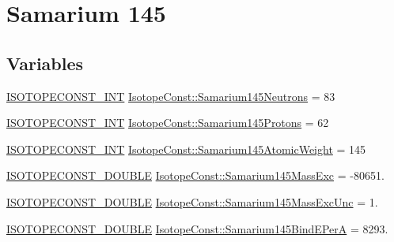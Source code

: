 \hypertarget{group___isotope_const-_samarium-_sm145}{}\section{Samarium 145}
\label{group___isotope_const-_samarium-_sm145}
\subsection*{Variables}
\begin{DoxyCompactItemize}
\item 
\mbox{\hyperlink{group___isotope_const-_macros_ga5f18360b3e99483a35c32d789e62621c}{I\+S\+O\+T\+O\+P\+E\+C\+O\+N\+S\+T\+\_\+\+I\+NT}} \mbox{\hyperlink{group___isotope_const-_samarium-_sm145_ga9203c0d6780ee502af8d9bd99e9adb3d}{Isotope\+Const\+::\+Samarium145\+Neutrons}} = 83
\item 
\mbox{\hyperlink{group___isotope_const-_macros_ga5f18360b3e99483a35c32d789e62621c}{I\+S\+O\+T\+O\+P\+E\+C\+O\+N\+S\+T\+\_\+\+I\+NT}} \mbox{\hyperlink{group___isotope_const-_samarium-_sm145_gaf61e64e167442d8c949a19465b5dec0b}{Isotope\+Const\+::\+Samarium145\+Protons}} = 62
\item 
\mbox{\hyperlink{group___isotope_const-_macros_ga5f18360b3e99483a35c32d789e62621c}{I\+S\+O\+T\+O\+P\+E\+C\+O\+N\+S\+T\+\_\+\+I\+NT}} \mbox{\hyperlink{group___isotope_const-_samarium-_sm145_ga1a430476f1e8e52a4878b48fd610f991}{Isotope\+Const\+::\+Samarium145\+Atomic\+Weight}} = 145
\item 
\mbox{\hyperlink{group___isotope_const-_macros_ga8f45a7272ce02c0b4c65c44636ed719a}{I\+S\+O\+T\+O\+P\+E\+C\+O\+N\+S\+T\+\_\+\+D\+O\+U\+B\+LE}} \mbox{\hyperlink{group___isotope_const-_samarium-_sm145_ga92b5221bc7791e91ebe1f0da40e47db5}{Isotope\+Const\+::\+Samarium145\+Mass\+Exc}} = -\/80651.
\item 
\mbox{\hyperlink{group___isotope_const-_macros_ga8f45a7272ce02c0b4c65c44636ed719a}{I\+S\+O\+T\+O\+P\+E\+C\+O\+N\+S\+T\+\_\+\+D\+O\+U\+B\+LE}} \mbox{\hyperlink{group___isotope_const-_samarium-_sm145_ga2569f043bb3e9d46b7c249e7b212ae51}{Isotope\+Const\+::\+Samarium145\+Mass\+Exc\+Unc}} = 1.
\item 
\mbox{\hyperlink{group___isotope_const-_macros_ga8f45a7272ce02c0b4c65c44636ed719a}{I\+S\+O\+T\+O\+P\+E\+C\+O\+N\+S\+T\+\_\+\+D\+O\+U\+B\+LE}} \mbox{\hyperlink{group___isotope_const-_samarium-_sm145_gada5bfb27a2d079d696a3547bbb071032}{Isotope\+Const\+::\+Samarium145\+Bind\+E\+PerA}} = 8293.
\item 

\end{DoxyCompactItemize}
